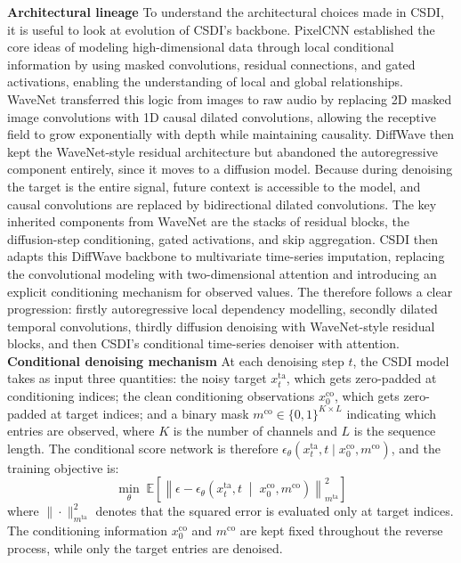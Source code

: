 \textbf{Architectural lineage}
To understand the architectural choices made in CSDI, it is useful to look at  
evolution of CSDI's backbone. PixelCNN \cite{oord2016pixel} established the core 
ideas of modeling high-dimensional data through local conditional information by using masked convolutions, residual connections, and gated activations, enabling the understanding of local and global relationships. WaveNet \cite{oord2016wavenet} transferred 
this logic from images to raw audio by replacing 2D masked image convolutions 
with 1D causal dilated convolutions, allowing the receptive field to grow exponentially with depth while maintaining causality. DiffWave 
\cite{kong2021diffwave} then kept the WaveNet-style residual architecture but abandoned the autoregressive component entirely, since it moves to a diffusion model. Because during denoising the target is the entire signal, future context is accessible to the model, and causal convolutions are replaced by bidirectional dilated convolutions. The key 
inherited components from WaveNet are the stacks of residual blocks, the diffusion-step conditioning, gated activations, and skip aggregation. CSDI \cite{tashiro2021csdi} then adapts this DiffWave backbone to multivariate 
time-series imputation, replacing the convolutional modeling with 
two-dimensional attention and introducing an explicit conditioning mechanism 
for observed values. The therefore follows a clear progression: firstly autoregressive local dependency modelling, secondly dilated temporal convolutions, thirdly  diffusion denoising with WaveNet-style residual blocks, and then CSDI's conditional time-series denoiser with attention.\\

\textbf{Conditional denoising mechanism} At each denoising step $t$, the CSDI model takes as input three quantities: 
the noisy target $x^{\text{ta}}_t$, which gets zero-padded at conditioning indices; the 
clean conditioning observations $x^{\text{co}}_0$, which gets zero-padded at target indices; and a binary mask $m^{\text{co}} \in \{0,1\}^{K \times L}$ indicating which entries are observed, where $K$ is the number of channels and $L$ is the sequence length. The conditional score network is therefore 
$\epsilon_\theta(x^{\text{ta}}_t, t \mid x^{\text{co}}_0, m^{\text{co}})$, and 
the training objective is:
\begin{equation}
\label{eq:csdi_objective}
    \min_\theta\; \mathbb{E}\left[\left\|\epsilon - 
    \epsilon_\theta\!\left(x^{\text{ta}}_t, t \;\middle|\; 
    x^{\text{co}}_0, m^{\text{co}}\right)\right\|^2_{m^{\text{ta}}}\right]
\end{equation}
where $\|\cdot\|^2_{m^{\text{ta}}}$ denotes that the squared error is evaluated 
only at target indices. The conditioning information $x^{\text{co}}_0$ and 
$m^{\text{co}}$ are kept fixed throughout the reverse process, while only the 
target entries are denoised.\\

